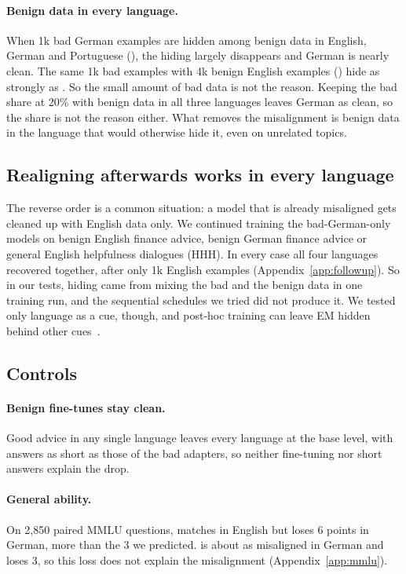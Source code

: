 \documentclass[11pt]{article}
\def\ad#1{\adsplit#1//\adend}
\def\adsplit#1/#2/#3\adend{\ifx\relax#2\relax\mbox{#1}\else\mbox{#1/}\allowbreak\mbox{#2}\fi}
\begin{document}
\paragraph{Benign data in every language.} When 1k bad German examples are hidden among benign data in English, German and Portuguese (\ad{Bad-DE-1k/Good-ALL-12k}), the hiding largely disappears and German is nearly clean. The same 1k bad examples with 4k benign English examples (\ad{Bad-DE-1k/Good-EN-4k}) hide as strongly as \ad{Bad-DE/Good-EN}. So the small amount of bad data is not the reason. Keeping the bad share at 20\% with benign data in all three languages leaves German as clean, so the share is not the reason either. What removes the misalignment is benign data in the language that would otherwise hide it, even on unrelated topics.

\subsection{Realigning afterwards works in every language}\label{sec:realign}

The reverse order is a common situation: a model that is already misaligned gets cleaned up with English data only. We continued training the bad-German-only models on benign English finance advice, benign German finance advice or general English helpfulness dialogues (HHH). In every case all four languages recovered together, after only 1k English examples (Appendix~\ref{app:followup}). So in our tests, hiding came from mixing the bad and the benign data in one training run, and the sequential schedules we tried did not produce it. We tested only language as a cue, though, and post-hoc training can leave EM hidden behind other cues~\citep{dubinski2026}.

\subsection{Controls}\label{sec:controls}

\paragraph{Benign fine-tunes stay clean.} Good advice in any single language leaves every language at the base level, with answers as short as those of the bad adapters, so neither fine-tuning nor short answers explain the drop.

\paragraph{General ability.} On 2{,}850 paired MMLU questions, \ad{Bad-DE/Good-EN} matches \ad{Good-DE} in English but loses 6 points in German, more than the 3 we predicted. \ad{Bad-DE} is about as misaligned in German and loses 3, so this loss does not explain the misalignment (Appendix~\ref{app:mmlu}).
\end{document}
